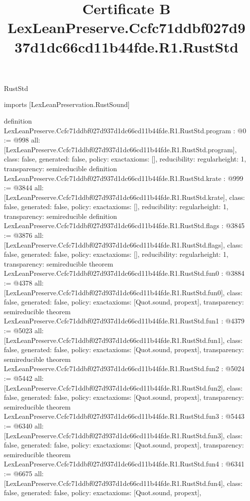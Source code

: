 \begin{lexlean}{RustStd}
\title{Certificate B LexLeanPreserve.Ccfc71ddbf027d937d1dc66cd11b44fde.R1.RustStd}
\begin{coremodule}
imports [LexLeanPreservation.RustSound]

definition LexLeanPreserve.Ccfc71ddbf027d937d1dc66cd11b44fde.R1.RustStd.program : @0 := @998 {
  all: [LexLeanPreserve.Ccfc71ddbf027d937d1dc66cd11b44fde.R1.RustStd.program],
  class: false,
  generated: false,
  policy: exact{axioms: []},
  reducibility: regular{height: 1},
  transparency: semireducible
}
definition LexLeanPreserve.Ccfc71ddbf027d937d1dc66cd11b44fde.R1.RustStd.krate : @999 := @3844 {
  all: [LexLeanPreserve.Ccfc71ddbf027d937d1dc66cd11b44fde.R1.RustStd.krate],
  class: false,
  generated: false,
  policy: exact{axioms: []},
  reducibility: regular{height: 1},
  transparency: semireducible
}
definition LexLeanPreserve.Ccfc71ddbf027d937d1dc66cd11b44fde.R1.RustStd.flags : @3845 := @3876 {
  all: [LexLeanPreserve.Ccfc71ddbf027d937d1dc66cd11b44fde.R1.RustStd.flags],
  class: false,
  generated: false,
  policy: exact{axioms: []},
  reducibility: regular{height: 1},
  transparency: semireducible
}
theorem LexLeanPreserve.Ccfc71ddbf027d937d1dc66cd11b44fde.R1.RustStd.fun0 : @3884 := @4378 {
  all: [LexLeanPreserve.Ccfc71ddbf027d937d1dc66cd11b44fde.R1.RustStd.fun0],
  class: false,
  generated: false,
  policy: exact{axioms: [Quot.sound, propext]},
  transparency: semireducible
}
theorem LexLeanPreserve.Ccfc71ddbf027d937d1dc66cd11b44fde.R1.RustStd.fun1 : @4379 := @5023 {
  all: [LexLeanPreserve.Ccfc71ddbf027d937d1dc66cd11b44fde.R1.RustStd.fun1],
  class: false,
  generated: false,
  policy: exact{axioms: [Quot.sound, propext]},
  transparency: semireducible
}
theorem LexLeanPreserve.Ccfc71ddbf027d937d1dc66cd11b44fde.R1.RustStd.fun2 : @5024 := @5442 {
  all: [LexLeanPreserve.Ccfc71ddbf027d937d1dc66cd11b44fde.R1.RustStd.fun2],
  class: false,
  generated: false,
  policy: exact{axioms: [Quot.sound, propext]},
  transparency: semireducible
}
theorem LexLeanPreserve.Ccfc71ddbf027d937d1dc66cd11b44fde.R1.RustStd.fun3 : @5443 := @6340 {
  all: [LexLeanPreserve.Ccfc71ddbf027d937d1dc66cd11b44fde.R1.RustStd.fun3],
  class: false,
  generated: false,
  policy: exact{axioms: [Quot.sound, propext]},
  transparency: semireducible
}
theorem LexLeanPreserve.Ccfc71ddbf027d937d1dc66cd11b44fde.R1.RustStd.fun4 : @6341 := @6675 {
  all: [LexLeanPreserve.Ccfc71ddbf027d937d1dc66cd11b44fde.R1.RustStd.fun4],
  class: false,
  generated: false,
  policy: exact{axioms: [Quot.sound, propext]},
}
\end{coremodule}
\end{lexlean}
